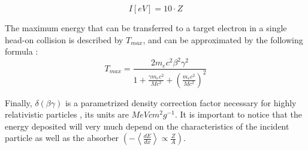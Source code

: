 \begin{equation}
    I \left[ eV \right] = 10 \cdot Z 
    \label{eq:ionizationEnergy}
\end{equation}

The maximum energy that can be transferred to a target electron in a single head-on collision is described by $T_{max}$, and can be approximated by the following formula \parencite*[][]{ref:TmaxFormula}: 
\begin{equation}
    T_{max} = \frac{2m_e c^2 \beta^2 \gamma^2}{1+\frac{\gamma m_e c^2}{M c^2}+\left( \frac{m_e c^2}{M c^2} \right)^2}
    \label{eq:tmax}
\end{equation}

Finally, $\delta (\beta \gamma)$ is a parametrized density correction factor necessary for highly relativistic particles \parencite*[][]{ref:Bethe}, its units are $MeV cm^2 g^{-1}$. It is important to notice that the energy deposited will very much depend on the characteristics of the incident particle as well as the absorber $\left( -\left< \frac{dE}{dx} \right> \propto \frac{Z}{A}  \right)$. 

